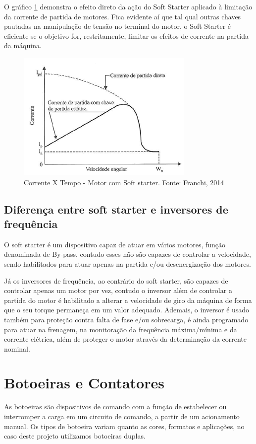\documentclass[a4paper, 12pt,oneside, english, brazil]{abntex2}
\begin{document}
O gráfico \ref{xx} demonstra o efeito direto da ação do Soft Starter aplicado à limitação da corrente de partida de motores. Fica evidente aí que tal qual outras chaves pautadas na manipulação de tensão no terminal do motor, o Soft Starter é eficiente se o objetivo for, restritamente, limitar os efeitos de corrente na partida da máquina.

\begin{figure}[H]
    \centering
    \includegraphics[scale=0.8]{graf.png}
    \caption{Corrente X Tempo - Motor com Soft starter. Fonte: Franchi, 2014}
    \label{xx}
\end{figure}

\subsection{Diferença entre soft starter e inversores de frequência }
O soft starter é um dispositivo capaz de atuar em vários motores, função denominada de By-pass, contudo esses não são capazes de controlar a velocidade, sendo habilitados para atuar apenas na partida e/ou desenergização dos motores.

Já os inversores de frequência, ao contrário do soft starter, são capazes de controlar apenas um motor por vez, contudo o inversor além de controlar a partida do motor é habilitado a alterar a velocidade de giro da máquina de forma que o seu torque permaneça em um valor adequado. Ademais, o inversor é usado também para proteção contra falta de fase e/ou sobrecarga, é ainda programado para atuar na frenagem, na monitoração da frequência máxima/mínima e da corrente elétrica, além de proteger o motor através da determinação da corrente nominal. 
\section{Botoeiras e Contatores}
As botoeiras são dispositivos de comando com a função de estabelecer ou interromper a carga em um circuito de comando, a partir de um acionamento manual. Os tipos de botoeira variam quanto as cores, formatos e aplicações, no caso deste projeto utilizamos botoeiras duplas. 
\end{document}
